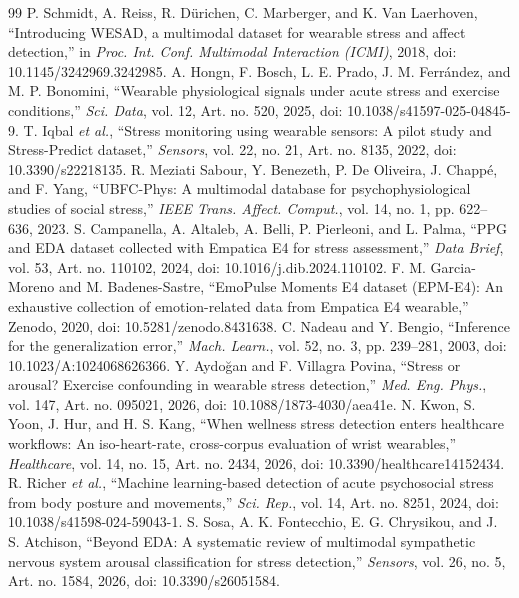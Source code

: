 \documentclass[journal]{IEEEtran}
\begin{document}
\begin{thebibliography}{99}
 P. Schmidt, A. Reiss, R. D\"urichen, C. Marberger, and K. Van Laerhoven, ``Introducing WESAD, a multimodal dataset for wearable stress and affect detection,'' in \emph{Proc. Int. Conf. Multimodal Interaction (ICMI)}, 2018, doi: 10.1145/3242969.3242985.
 A. Hongn, F. Bosch, L. E. Prado, J. M. Ferr\'andez, and M. P. Bonomini, ``Wearable physiological signals under acute stress and exercise conditions,'' \emph{Sci. Data}, vol. 12, Art. no. 520, 2025, doi: 10.1038/s41597-025-04845-9.
 T. Iqbal \emph{et al.}, ``Stress monitoring using wearable sensors: A pilot study and Stress-Predict dataset,'' \emph{Sensors}, vol. 22, no. 21, Art. no. 8135, 2022, doi: 10.3390/s22218135.
 R. Meziati Sabour, Y. Benezeth, P. De Oliveira, J. Chapp\'e, and F. Yang, ``UBFC-Phys: A multimodal database for psychophysiological studies of social stress,'' \emph{IEEE Trans. Affect. Comput.}, vol. 14, no. 1, pp. 622--636, 2023.
 S. Campanella, A. Altaleb, A. Belli, P. Pierleoni, and L. Palma, ``PPG and EDA dataset collected with Empatica E4 for stress assessment,'' \emph{Data Brief}, vol. 53, Art. no. 110102, 2024, doi: 10.1016/j.dib.2024.110102.
 F. M. Garcia-Moreno and M. Badenes-Sastre, ``EmoPulse Moments E4 dataset (EPM-E4): An exhaustive collection of emotion-related data from Empatica E4 wearable,'' Zenodo, 2020, doi: 10.5281/zenodo.8431638.
 C. Nadeau and Y. Bengio, ``Inference for the generalization error,'' \emph{Mach. Learn.}, vol. 52, no. 3, pp. 239--281, 2003, doi: 10.1023/A:1024068626366.
 Y. Aydo\u{g}an and F. Villagra Povina, ``Stress or arousal? Exercise confounding in wearable stress detection,'' \emph{Med. Eng. Phys.}, vol. 147, Art. no. 095021, 2026, doi: 10.1088/1873-4030/aea41e.
 N. Kwon, S. Yoon, J. Hur, and H. S. Kang, ``When wellness stress detection enters healthcare workflows: An iso-heart-rate, cross-corpus evaluation of wrist wearables,'' \emph{Healthcare}, vol. 14, no. 15, Art. no. 2434, 2026, doi: 10.3390/healthcare14152434.
 R. Richer \emph{et al.}, ``Machine learning-based detection of acute psychosocial stress from body posture and movements,'' \emph{Sci. Rep.}, vol. 14, Art. no. 8251, 2024, doi: 10.1038/s41598-024-59043-1.
 S. Sosa, A. K. Fontecchio, E. G. Chrysikou, and J. S. Atchison, ``Beyond EDA: A systematic review of multimodal sympathetic nervous system arousal classification for stress detection,'' \emph{Sensors}, vol. 26, no. 5, Art. no. 1584, 2026, doi: 10.3390/s26051584.

\end{thebibliography}
\end{document}
